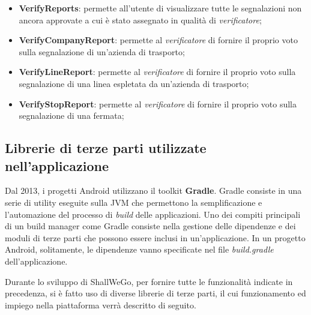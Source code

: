 \begin{itemize}
                \item \textbf{VerifyReports}: permette all'utente di visualizzare tutte le segnalazioni non ancora approvate a cui è stato assegnato in qualità di \textit{verificatore};
                \item \textbf{VerifyCompanyReport}: permette al \textit{verificatore} di fornire il proprio voto sulla segnalazione di un'azienda di trasporto;
                \item \textbf{VerifyLineReport}: permette al \textit{verificatore} di fornire il proprio voto sulla segnalazione di una linea espletata da un'azienda di trasporto;
                \item \textbf{VerifyStopReport}: permette al \textit{verificatore} di fornire il proprio voto sulla segnalazione di una fermata;
            \end{itemize}
        
            \subsection{Librerie di terze parti utilizzate nell'applicazione}
                Dal 2013, i progetti Android utilizzano il toolkit \textbf{Gradle}. Gradle consiste in una serie di utility eseguite sulla JVM che permettono la semplificazione e l'automazione del processo di \textit{build} delle applicazioni. Uno dei compiti principali di un build manager come Gradle consiste nella gestione delle dipendenze e dei moduli di terze parti che possono essere inclusi in un'applicazione. In un progetto Android, solitamente, le dipendenze vanno specificate nel file \textit{build.gradle} dell'applicazione.

                Durante lo sviluppo di ShallWeGo, per fornire tutte le funzionalità indicate in precedenza, si è fatto uso di diverse librerie di terze parti, il cui funzionamento ed impiego nella piattaforma verrà descritto di seguito.

